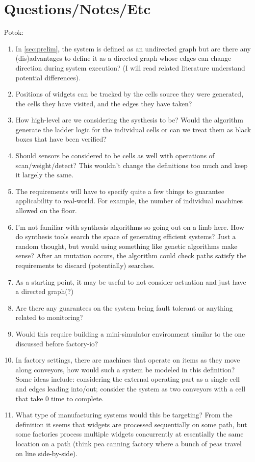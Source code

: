 \documentclass[9pt,conference, compsocconf]{IEEEtran}
\begin{document}
\section{Questions/Notes/Etc}
	Potok:
	\begin{enumerate}
		\item In \ref{sec:prelim}, the system is defined as an undirected graph but are there any (dis)advantages to define it as a directed graph whose edges can change direction during system execution? (I will read related literature understand potential differences).
		\item Positions of widgets can be tracked by the cells source they were generated, the cells they have visited, and the edges they have taken?
		\item How high-level are we considering the systhesis to be? Would the algorithm generate the ladder logic for the individual cells or can we treat them as black boxes that have been verified?
		\item Should sensors be considered to be cells as well with operations of scan/weight/detect? This wouldn't change the definitions too much and keep it largely the same.
		\item The requirements will have to specify quite a few things to guarantee applicability to real-world. For example, the number of individual machines allowed on the floor.
		\item I'm not familiar with synthesis algorithms so going out on a limb here. How do synthesis tools search the space of generating efficient systems? Just a random thought, but would using something like genetic algorithms make sense? After an mutation occurs, the algorithm could check paths satisfy the requirements to discard (potentially) searches.
		\item As a starting point, it may be useful to not consider actuation and just have a directed graph(?)
		\item Are there any guarantees on the system being fault tolerant or anything related to monitoring?
		\item Would this require building a mini-simulator environment similar to the one discussed before factory-io?
		\item In factory settings, there are machines that operate on items as they move along conveyors, how would such a system be modeled in this definition? Some ideas include: considering the external operating part as a single cell and edges leading into/out; consider the system as two conveyors with a cell that take 0 time to complete.
		\item What type of manufacturing systems would this be targeting? From the definition it seems that widgets are processed sequentially on some path, but some factories process multiple widgets concurrently at essentially the same location on a path (think pea canning factory where a bunch of peas travel on line side-by-side). 
	\end{enumerate}




%

\end{document}
